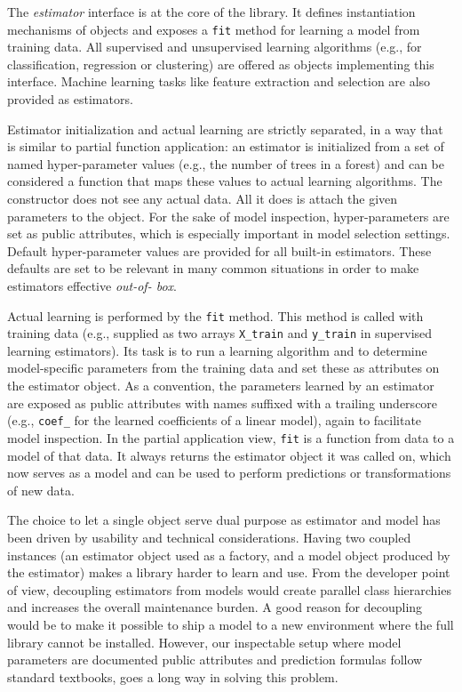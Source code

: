 The \textit{estimator} interface is at the core of the library. It defines
instantiation mechanisms of objects and exposes a \texttt{fit} method for
learning a model from training data.  All supervised and unsupervised learning
algorithms (e.g., for classification, regression or clustering) are offered as
objects implementing this interface. Machine learning tasks like feature
extraction and selection are also provided as estimators.

Estimator initialization and actual learning are strictly separated, in a way
that is similar to partial function application: an estimator is initialized
from a set of named hyper-parameter values (e.g., the number of trees in a
forest) and can be considered a function that maps these values to actual
learning algorithms. The constructor does not see any actual data. All it does
is attach the given parameters to the object. For the sake of model inspection,
hyper-parameters are set as public attributes, which is especially important in
model selection settings. Default hyper-parameter values are provided for all
built-in estimators. These defaults are set to be relevant in many common
situations in order to make estimators effective \textit{out-of- box}.

Actual learning is performed by the \texttt{fit} method. This method is called
with training data (e.g., supplied as two arrays \texttt{X\_train} and
\texttt{y\_train} in supervised learning estimators). Its task is to run a
learning algorithm and to determine model-specific parameters from the training
data and set these as attributes on the estimator object. As a convention, the
parameters learned by an estimator are exposed as public attributes with names
suffixed with a trailing underscore (e.g., \texttt{coef\_} for the learned
coefficients of a linear model), again to facilitate model inspection. In the
partial application view, \texttt{fit} is a function from data to a model of
that data. It always returns the estimator object it was called on, which now
serves as a model and can be used to perform predictions or transformations of
new data.

The choice to let a single object serve dual purpose as estimator and model has
been driven by usability and technical considerations. Having two coupled
instances (an estimator object used as a factory, and a model object produced
by the estimator) makes a library harder to learn and use. From the developer
point of view, decoupling estimators from models would create parallel class
hierarchies and increases the overall maintenance burden. A good reason for
decoupling would be to make it possible to ship a model to a new environment
where the full library cannot be installed. However, our inspectable setup
where model parameters are documented public attributes and prediction formulas
follow standard textbooks, goes a long way in solving this problem.

